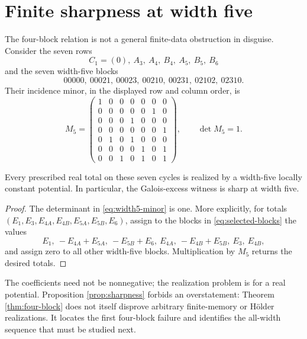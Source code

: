 \section{Finite sharpness at width five}

The four-block relation is not a general finite-data obstruction in
disguise.  Consider the seven rows
\[
 C_1=(0),\ A_3,\ A_4,\ B_4,\ A_5,\ B_5,\ B_6
\]
and the seven width-five blocks
\begin{equation}\label{eq:selected-blocks}
 00000,\ 00021,\ 00023,\ 00210,\ 00231,\ 02102,\ 02310.
\end{equation}
Their incidence minor, in the displayed row and column order, is
\begin{equation}\label{eq:width5-minor}
 M_5=\begin{pmatrix}
1&0&0&0&0&0&0\\
0&0&0&0&0&1&0\\
0&0&0&1&0&0&0\\
0&0&0&0&0&0&1\\
0&1&0&1&0&0&0\\
0&0&0&0&1&0&1\\
0&0&1&0&1&0&1
\end{pmatrix},\qquad \det M_5=1.
\end{equation}

\begin{proposition}\label{prop:sharpness}
Every prescribed real total on these seven cycles is realized by a
width-five locally constant potential.  In particular, the Galois-excess
witness is sharp at width five.
\end{proposition}

\begin{proof}
The determinant in \eqref{eq:width5-minor} is one.  More explicitly, for
totals \((E_1,E_3,E_{4A},E_{4B},E_{5A},E_{5B},E_6)\), assign to the blocks
in \eqref{eq:selected-blocks} the values
\[
 E_1,\ -E_{4A}+E_{5A},\ -E_{5B}+E_6,\ E_{4A},\
 -E_{4B}+E_{5B},\ E_3,\ E_{4B},
\]
and assign zero to all other width-five blocks.  Multiplication by \(M_5\)
returns the desired totals.
\end{proof}

The coefficients need not be nonnegative; the realization problem is for a
real potential.  Proposition \ref{prop:sharpness} forbids an overstatement:
Theorem \ref{thm:four-block} does not itself disprove arbitrary finite-memory
or H\"older realizations.  It locates the first four-block failure and
identifies the all-width sequence that must be studied next.
